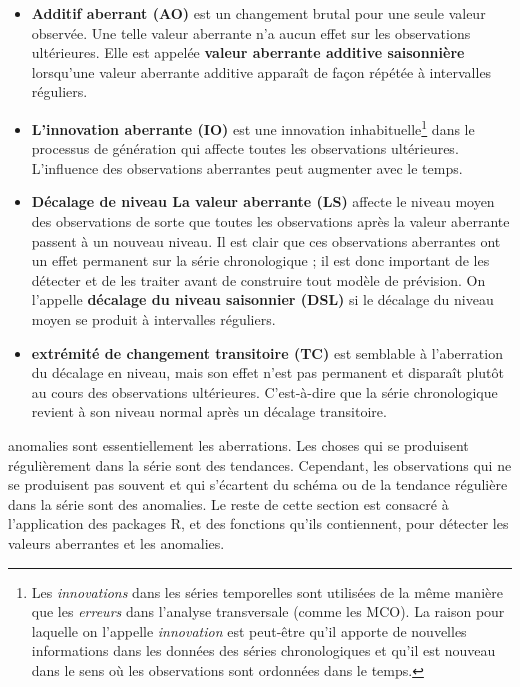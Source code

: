 \begin{itemize}[noitemsep]
\item \textbf{Additif aberrant (AO)} est un changement brutal pour une seule valeur observée. Une telle valeur aberrante n'a aucun effet sur les observations ultérieures. Elle est appelée \textbf{valeur aberrante additive saisonnière} lorsqu'une valeur aberrante additive apparaît de façon répétée à intervalles réguliers.
\item \textbf{L'innovation aberrante (IO)} est une innovation inhabituelle\footnote{Les \textit{innovations} dans les séries temporelles sont utilisées de la même manière que les \textit{erreurs} dans l'analyse transversale (comme les MCO). La raison pour laquelle on l'appelle \textit{innovation} est peut-être qu'il apporte de nouvelles informations dans les données des séries chronologiques et qu'il est nouveau dans le sens où les observations sont ordonnées dans le temps.} dans le processus de génération qui affecte toutes les observations ultérieures. L'influence des observations aberrantes peut augmenter avec le temps.
\item \textbf{Décalage de niveau La valeur aberrante (LS)} affecte le niveau moyen des observations de sorte que toutes les observations après la valeur aberrante passent à un nouveau niveau. Il est clair que ces observations aberrantes ont un effet permanent sur la série chronologique ; il est donc important de les détecter et de les traiter avant de construire tout modèle de prévision. On l'appelle \textbf{décalage du niveau saisonnier (DSL)} si le décalage du niveau moyen se produit à intervalles réguliers.
\item \textbf{extrémité de changement transitoire (TC)} est semblable à l'aberration du décalage en niveau, mais son effet n'est pas permanent et disparaît plutôt au cours des observations ultérieures. C'est-à-dire que la série chronologique revient à son niveau normal après un décalage transitoire.
\end{itemize}
\par anomalies sont essentiellement les aberrations. Les choses qui se produisent régulièrement dans la série sont des tendances. Cependant, les observations qui ne se produisent pas souvent et qui s'écartent du schéma ou de la tendance régulière dans la série sont des anomalies.
Le reste de cette section est consacré à l'application des packages R, et des fonctions qu'ils contiennent, pour détecter les valeurs aberrantes et les anomalies. 
